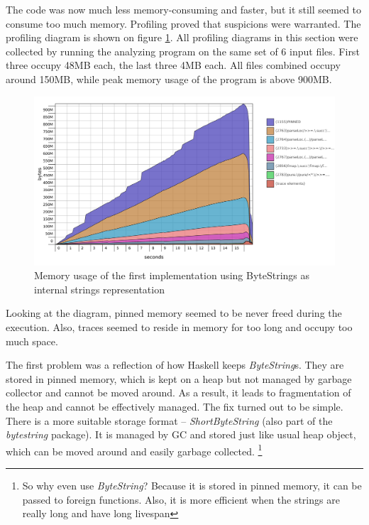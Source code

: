 The code was now much less memory-consuming and faster, but it still seemed to consume too much memory.
Profiling proved that suspicions were warranted. The profiling diagram is shown on figure \ref{fig:bytestring-lazy}. 
All profiling diagrams in this section were collected by running the analyzing program on the same set of 6 input files.
First three occupy 48MB each, the last three 4MB each.
All files combined occupy around 150MB, while peak memory usage of the program is above 900MB.

\begin{figure}[hbt!]
 \centering
 \includegraphics[width=\textwidth]{png/bytestring-lazy}
 \caption{Memory usage of the first implementation using ByteStrings as internal strings representation}
 \label{fig:bytestring-lazy}
\end{figure}

Looking at the diagram, pinned memory seemed to be never freed during the execution. 
Also, traces seemed to reside in memory for too long and occupy too much space. 

The first problem was a reflection of how Haskell keeps \emph{ByteString}s.
They are stored in pinned memory, which is kept on a heap but 
not managed by garbage collector \cite{haskell:shortbytestring-and-text} and cannot be moved around.
As a result, it leads to fragmentation of the heap and cannot be effectively managed.
The fix turned out to be simple. There is a more suitable storage format -- \emph{ShortByteString} 
(also part of the \emph{bytestring} package). It is managed
by GC and stored just like usual heap object, which can be moved around and easily garbage collected.
\footnote{So why even use \emph{ByteString}? Because it is stored in pinned memory, it can be passed to foreign functions.
Also, it is more efficient when the strings are really long and have long livespan}

